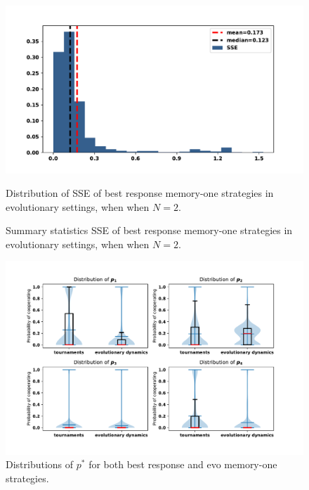 \documentclass[10pt]{article}
\begin{document}
\begin{figure}[!htbp]
    \begin{minipage}{0.72\textwidth}
            \begin{center}
            \includegraphics[width=\linewidth]{img/evo_sserror.pdf}
            \end{center}
            \caption{Distribution of SSE of best response memory-one strategies in
            evolutionary settings, when when \(N=2\).}
            \label{fig:sserror_mem_one}
    \end{minipage}\hspace{1cm}
    \begin{minipage}{0.21\textwidth}
        \centering
        \captionsetup{type=table}
        \resizebox{.85\columnwidth}{!}{%
            }
            \caption{Summary statistics SSE of best response memory-one strategies in
            evolutionary settings, when when \(N=2\).}
            \label{table:sserror_stats}
      \end{minipage}
\end{figure}

\begin{figure}[!htbp]
    \centering
    \includegraphics[width=.8\textwidth]{img/behaviour_violin_plots.pdf}
    \caption{Distributions of \(p^*\) for both best response and evo memory-one
    strategies.}
    \label{fig:behaviour_violin_plots}
\end{figure}
\end{document}
